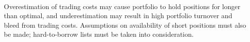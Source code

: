 \begin{remark} \\
Overestimation of trading costs may cause portfolio to hold positions for longer than optimal, and underestimation may result in high portfolio turnover and bleed from trading costs. Assumptions on availability of short positions must also be made; hard-to-borrow lists must be taken into consideration.
\end{remark}
